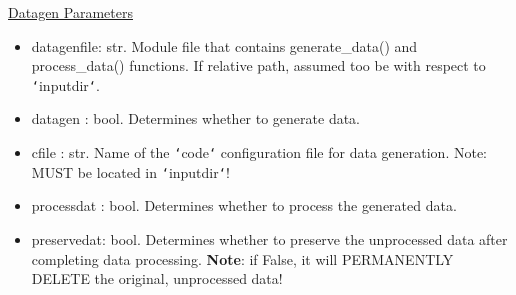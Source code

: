 \documentclass[letterpaper, 12pt]{article}
\begin{document}
\noindent \underline{Datagen Parameters}
\begin{itemize}
\item datagenfile: str.  Module file that contains generate_data() and 
                         process_data() functions.
                         If relative path, assumed too be with respect to 
                         \texttt{`}inputdir\texttt{`}.
\item datagen    : bool. Determines whether to generate data.
\item cfile      : str.  Name of the \texttt{`}code\texttt{`} configuration 
                         file for data generation.
                   Note: MUST be located in \texttt{`}inputdir\texttt{`}!
\item processdat : bool. Determines whether to process the generated data.
\item preservedat: bool. Determines whether to preserve the unprocessed data 
                         after completing data processing.
                   \textbf{Note}: if False, it will PERMANENTLY DELETE the 
                          original, unprocessed data!
\end{itemize}
\end{document}
